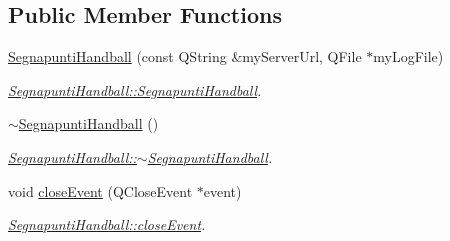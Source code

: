 \subsection*{Public Member Functions}
\begin{DoxyCompactItemize}
\item 
\mbox{\hyperlink{classSegnapuntiHandball_a0581dd7d17d9a2d4acef3ec91e6009a6}{Segnapunti\+Handball}} (const Q\+String \&my\+Server\+Url, Q\+File $\ast$my\+Log\+File)
\begin{DoxyCompactList}\small\item\em \mbox{\hyperlink{classSegnapuntiHandball_a0581dd7d17d9a2d4acef3ec91e6009a6}{Segnapunti\+Handball\+::\+Segnapunti\+Handball}}. \end{DoxyCompactList}\item 
\mbox{\label{classSegnapuntiHandball_a6f482b981bb004a00f0f9a756b52c32b}} 
\mbox{\hyperlink{classSegnapuntiHandball_a6f482b981bb004a00f0f9a756b52c32b}{$\sim$\+Segnapunti\+Handball}} ()
\begin{DoxyCompactList}\small\item\em \mbox{\hyperlink{classSegnapuntiHandball_a6f482b981bb004a00f0f9a756b52c32b}{Segnapunti\+Handball\+::$\sim$\+Segnapunti\+Handball}}. \end{DoxyCompactList}\item 
void \mbox{\hyperlink{classSegnapuntiHandball_a1200027eefb42a1e69edaad2349190d4}{close\+Event}} (Q\+Close\+Event $\ast$event)
\begin{DoxyCompactList}\small\item\em \mbox{\hyperlink{classSegnapuntiHandball_a1200027eefb42a1e69edaad2349190d4}{Segnapunti\+Handball\+::close\+Event}}. \end{DoxyCompactList}\end{DoxyCompactItemize}
